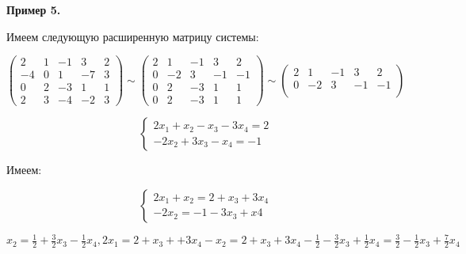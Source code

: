 \documentclass{article}
\begin{document}
\begin{flushleft}
\textbf{Пример 5.}

Имеем следующую расширенную матрицу системы:

$\begin{pmatrix}
    2 & 1 & -1 & 3 & 2 \\
    -4 & 0 & 1 & -7 & 3 \\
    0 & 2 & -3 & 1 & 1 \\
    2 & 3 & -4 & -2 & 3
\end{pmatrix} \sim \begin{pmatrix}
    2 & 1 & -1 & 3 & 2 \\
    0 & -2 & 3 & -1 & -1 \\
    0 & 2 & -3 & 1 & 1 \\
    0 & 2 & -3 & 1 & 1
\end{pmatrix} \sim \begin{pmatrix}
    2 & 1 & -1 & 3 & 2 \\
    0 & -2 & 3 & -1 & -1 \\
\end{pmatrix}$

\begin{equation}
    \begin{cases}
        2x_1 + x_2 - x_3 - 3x_4 = 2 \\
        -2x_2 + 3x_3 - x_4 = -1
    \end{cases}
\end{equation}

Имеем:

\begin{equation}
    \begin{cases}
        2x_1 + x_2 = 2 + x_3 + 3x_4 \\
        -2x_2 = -1 - 3x_3 + x4
    \end{cases}
\end{equation}

\hfill

$x_2 = \frac{1}{2} + \frac{3}{2}x_3 - \frac{1}{2}x_4, 2x_1 = 2 + x_3 + + 3x_4 - x_2 = 2 + x_3 + 3x_4 - \frac{1}{2} - \frac{3}{2}x_3 + \frac{1}{2}x_4 = \frac{3}{2} - \frac{1}{2}x_3 + \frac{7}{2}x_4$

\hfill


\end{flushleft}
\end{document}
